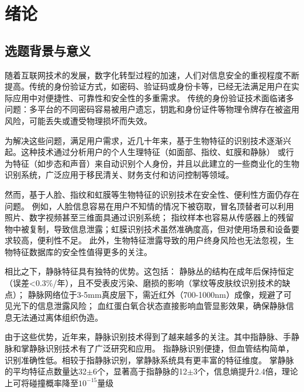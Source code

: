 
\chapter{绪论}
\label{cha:introduction}
\section{选题背景与意义}
\label{sec:background}

随着互联网技术的发展，数字化转型过程的加速，人们对信息安全的重视程度不断提高。传统的身份验证方式，如密码、验证码或身份卡等，已经无法满足用户在实际应用中对便捷性、可靠性和安全性的多重需求。
传统的身份验证技术面临诸多问题：多平台的不同密码容易被用户遗忘，钥匙和身份证件等物理令牌存在被盗用风险，可能丢失或遭受物理损坏而失效。

为解决这些问题，满足用户需求，近几十年来，基于生物特征的识别技术逐渐兴起。这种技术通过分析用户的个人生理特征（如面部\cite{turk1991face}、指纹\cite{jain1997line}、虹膜\cite{daugman2009iris}和静脉\cite{qin2017deep}）
或行为特征（如步态\cite{wang2003silhouette}和声音\cite{perrachione2011human}）来自动识别个人身份，并且以此建立的一些商业化的生物识别系统，广泛应用于移民清关、财务支付和访问控制等领域。

然而，基于人脸、指纹和虹膜等生物特征的识别技术在安全性、便利性方面仍存在问题。
例如，人脸信息容易在用户不知情的情况下被窃取\cite{chingovska2012effectiveness}，冒名顶替者可以利用照片、数字视频甚至三维面具\cite{nesli2013spoofing}通过识别系统；
指纹样本也容易从传感器上的残留物中被复制，导致信息泄露；虹膜识别技术虽然准确度高，但对使用场景和设备要求较高，便利性不足。
此外，生物特征泄露导致的用户终身风险也无法忽视，生物特征数据库的安全性值得更多的关注。

相比之下，静脉特征具有独特的优势。这包括：
静脉丛的结构在成年后保持恒定（误差<$0.3\%$/年），且不受表皮污染、磨损的影响（掌纹等皮肤纹识别技术的缺点）；
静脉网络位于3-5mm真皮层下，需近红外（700-1000nm）成像，规避了可见光下的信息泄露风险；
血红蛋白氧合状态直接影响血管显影效果，确保静脉信息无法通过离体组织伪造。

由于这些优势，近年来，静脉识别技术得到了越来越多的关注。其中指静脉、手静脉和掌静脉识别技术有了广泛研究和应用。
指静脉识别便捷，但血管结构简单，识别准确性低。相较于指静脉识别，掌静脉系统具有更丰富的特征维度。
掌静脉的平均特征点数量达32$\pm$6个，显著高于指静脉的12$\pm$3个，信息熵提升2.4倍，理论上可将碰撞概率降至$10^{-15}$量级

